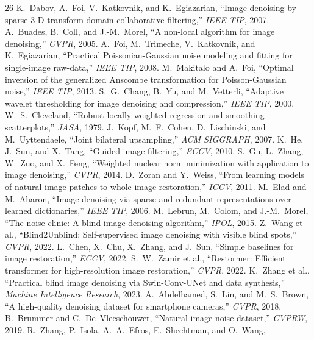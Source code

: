 \documentclass[journal]{IEEEtran}
\begin{document}
\clearpage
\begin{thebibliography}{26}\small
{} K.~Dabov, A.~Foi, V.~Katkovnik, and K.~Egiazarian, ``Image
denoising by sparse 3-D transform-domain collaborative filtering,'' \emph{IEEE
TIP}, 2007.
 A.~Buades, B.~Coll, and J.-M.~Morel, ``A non-local algorithm for
image denoising,'' \emph{CVPR}, 2005.
 A.~Foi, M.~Trimeche, V.~Katkovnik, and K.~Egiazarian,
``Practical Poissonian-Gaussian noise modeling and fitting for single-image
raw-data,'' \emph{IEEE TIP}, 2008.
 M.~Makitalo and A.~Foi, ``Optimal inversion of the
generalized Anscombe transformation for Poisson-Gaussian noise,'' \emph{IEEE
TIP}, 2013.
 S.~G.~Chang, B.~Yu, and M.~Vetterli, ``Adaptive wavelet
thresholding for image denoising and compression,'' \emph{IEEE TIP}, 2000.
 W.~S.~Cleveland, ``Robust locally weighted regression and
smoothing scatterplots,'' \emph{JASA}, 1979.
 J.~Kopf, M.~F.~Cohen, D.~Lischinski, and M.~Uyttendaele,
``Joint bilateral upsampling,'' \emph{ACM SIGGRAPH}, 2007.
 K.~He, J.~Sun, and X.~Tang, ``Guided image filtering,''
\emph{ECCV}, 2010.
 S.~Gu, L.~Zhang, W.~Zuo, and X.~Feng, ``Weighted nuclear norm
minimization with application to image denoising,'' \emph{CVPR}, 2014.
 D.~Zoran and Y.~Weiss, ``From learning models of natural image
patches to whole image restoration,'' \emph{ICCV}, 2011.
 M.~Elad and M.~Aharon, ``Image denoising via sparse and
redundant representations over learned dictionaries,'' \emph{IEEE TIP}, 2006.
 M.~Lebrun, M.~Colom, and J.-M.~Morel, ``The noise
clinic: A blind image denoising algorithm,'' \emph{IPOL}, 2015.
 Z.~Wang et al., ``Blind2Unblind: Self-supervised image denoising
with visible blind spots,'' \emph{CVPR}, 2022.
 L.~Chen, X.~Chu, X.~Zhang, and J.~Sun, ``Simple baselines for
image restoration,'' \emph{ECCV}, 2022.
 S.~W.~Zamir et al., ``Restormer: Efficient transformer for
high-resolution image restoration,'' \emph{CVPR}, 2022.
 K.~Zhang et al., ``Practical blind image denoising via
Swin-Conv-UNet and data synthesis,'' \emph{Machine Intelligence Research},
2023.
 A.~Abdelhamed, S.~Lin, and M.~S.~Brown, ``A high-quality
denoising dataset for smartphone cameras,'' \emph{CVPR}, 2018.
 B.~Brummer and C.~De~Vleeschouwer, ``Natural image noise
dataset,'' \emph{CVPRW}, 2019.
 R.~Zhang, P.~Isola, A.~A.~Efros, E.~Shechtman, and O.~Wang,

\end{thebibliography}
\end{document}
